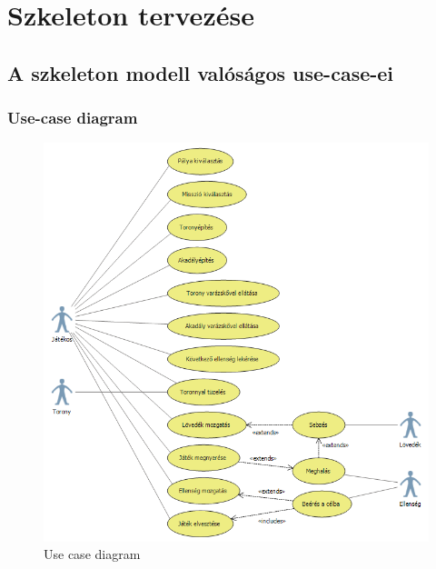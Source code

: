 %
\chapter{Szkeleton tervezése}

\thispagestyle{fancy}

\section{A szkeleton modell valóságos use-case-ei}

\subsection{Use-case diagram}

\begin{figure}[H]
\begin{center}
\includegraphics[width=17cm]{images/skeleton_use_case.png}
\caption{Use case diagram}
\label{fig:SzkeletonUseCase}
\end{center}
\end{figure}

\pagebreak

